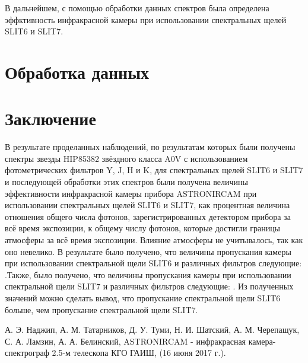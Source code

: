 \documentclass[a4paper]{article}
\begin{document}
В дальнейшем, с помощью обработки данных спектров была определена эффктивность инфракрасной камеры при использовании спектральных щелей SLIT6 и SLIT7.

\hfill\break

\section{Обработка данных}







\hfill\break

\section{Заключение}
В результате проделанных наблюдений, по результатам которых были получены спектры звезды HIP85382 звёздного класса A0V с использованием фотометрических фильтров Y, J, H и K, для спектральных щелей SLIT6 и SLIT7 и последующей обработки этих спектров были получена величины эффективности инфракрасной камеры прибора ASTRONIRCAM при использовании спектральных щелей SLIT6 и SLIT7, как процентная величина отношения общего числа фотонов, зарегистрированных детектором прибора за всё время экспозиции, к общему числу фотонов, которые достигли границы атмосферы за всё время экспозиции. Влияние атмосферы не учитывалось, так как оно невелико. В результате было получено, что величины пропускания камеры при использовании спектральной щели SLIT6 и различных фильтров следующие:     .Также, было получено, что величины пропускания камеры при использовании спектральной щели SLIT7 и различных фильтров следующие:          . Из полученных значений можно сделать вывод, что пропускание спектральной щели SLIT6 больше, чем пропускание спектральной щели SLIT7.

\hfill\break

\begin{thebibliography}{3}
А. Э. Наджип, А. М. Татарников, Д. У. Туми, Н. И. Шатский, А. М. Черепащук, С. А. Ламзин, А. А. Белинский,  ASTRONIRCAM - инфракрасная камера-спектрограф 2.5-м телескопа КГО ГАИШ, (16 июня 2017 г.).
\end{thebibliography}
\end{document}
